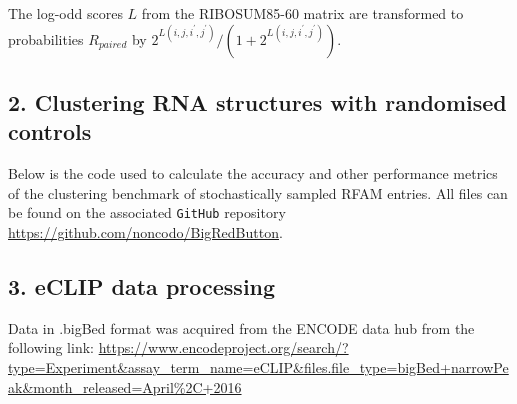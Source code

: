 \documentclass{bmcart}
\begin{document}
\noindent The log-odd scores $L$ from the RIBOSUM85-60 matrix \cite{Klein14499004}
	are transformed to probabilities $R_{paired}$ by $2^{L(i,j,i^\prime,j^\prime)} / (1 + 2^{L(i,j,i^\prime,j^\prime)})$.\\


\subsection*{ 2. Clustering RNA structures with randomised controls }

Below is the code used to calculate the accuracy and other performance metrics of 
the clustering benchmark of stochastically sampled RFAM entries. All files can be found on the 
associated \texttt{GitHub} repository \url{https://github.com/noncodo/BigRedButton}.




\subsection*{ 3. eCLIP data processing }
Data in .bigBed format was acquired from the ENCODE data hub from the following link:
\url{https://www.encodeproject.org/search/?type=Experiment&assay_term_name=eCLIP&files.file_type=bigBed+narrowPeak&month_released=April\%2C+2016}
\end{document}
